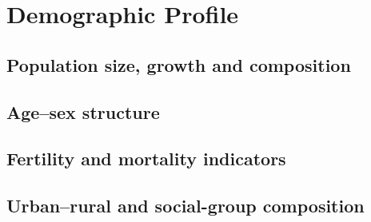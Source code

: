\section{Demographic Profile}
\lipsum[40]
\subsection{Population size, growth and composition}
\subsection{Age--sex structure}
\subsection{Fertility and mortality indicators}
\subsection{Urban--rural and social-group composition}